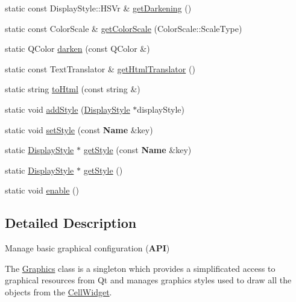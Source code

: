 \begin{DoxyCompactItemize}
\item 
static const Display\-Style\-::\-H\-S\-Vr \& \hyperlink{classHurricane_1_1Graphics_af34b6fe518ecb3f2959731f055ee27ff}{get\-Darkening} ()
\item 
static const Color\-Scale \& \hyperlink{classHurricane_1_1Graphics_a8735a458885beb3b74ad5fb77db82797}{get\-Color\-Scale} (Color\-Scale\-::\-Scale\-Type)
\item 
static Q\-Color \hyperlink{classHurricane_1_1Graphics_ab4c69a277249850a397a4c5fce31f965}{darken} (const Q\-Color \&)
\item 
static const Text\-Translator \& \hyperlink{classHurricane_1_1Graphics_a2f5e702ff1ea293edc5a89aaae1facf2}{get\-Html\-Translator} ()
\item 
static string \hyperlink{classHurricane_1_1Graphics_a51b3772138b33a85204abbee08898987}{to\-Html} (const string \&)
\item 
static void \hyperlink{classHurricane_1_1Graphics_ac64dd095224b3f9dfbbdcfc242b11a77}{add\-Style} (\hyperlink{classHurricane_1_1DisplayStyle}{Display\-Style} $\ast$display\-Style)
\item 
static void \hyperlink{classHurricane_1_1Graphics_acb9975e354d7c802fa3064ceb800db90}{set\-Style} (const {\bf Name} \&key)
\item 
static \hyperlink{classHurricane_1_1DisplayStyle}{Display\-Style} $\ast$ \hyperlink{classHurricane_1_1Graphics_a2506213ff4c28b22d356e7bfbb242ed6}{get\-Style} (const {\bf Name} \&key)
\item 
static \hyperlink{classHurricane_1_1DisplayStyle}{Display\-Style} $\ast$ \hyperlink{classHurricane_1_1Graphics_aef89b1aa2be83b61ae0838a219d2b696}{get\-Style} ()
\item 
static void \hyperlink{classHurricane_1_1Graphics_a08e5240382c4bc97fd84b6fa0e7d8b8e}{enable} ()
\end{DoxyCompactItemize}


\subsection{Detailed Description}
Manage basic graphical configuration ({\bfseries A\-P\-I}) 

The \hyperlink{classHurricane_1_1Graphics}{Graphics} class is a singleton which provides a simplificated access to graphical resources from Qt and manages graphics styles used to draw all the objects from the \hyperlink{classHurricane_1_1CellWidget}{Cell\-Widget}. 


